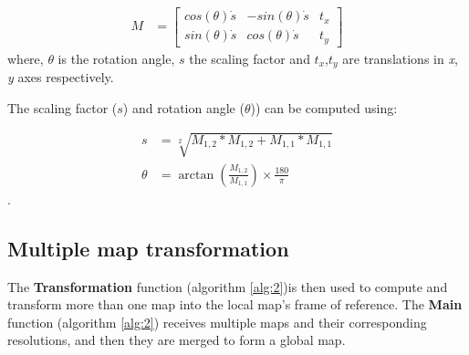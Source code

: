 \begin{align}
M &=
\begin{bmatrix}
cos(\theta)\dot s &  -sin(\theta)\dot s & t_x\\
sin(\theta)\dot s &  cos(\theta)\dot s & t_y 
\end{bmatrix}
\label{eq:rotation-mat}
\end{align}
where, \(\theta\) is the rotation angle, \(s\) the scaling factor and $t_x$,$t_y$ are translations in \textit{x}, \textit{y} axes respectively.

The scaling factor ($s$) and rotation angle ($\theta$)) can be computed using:

\begin{equation}
\begin{split} 
s &=  \sqrt[2]{ M_{1,2}*M_{1,2} + M_{1,1}*M_{1,1} }  \\ 
\theta &= \arctan{(\frac{M_{1,2}}{M_{1,1}})} \times \frac{180}{\pi}
\label{eq:rotat_scale}
\end{split}
\end{equation}.


\subsection{Multiple map transformation}

The \textbf{Transformation} function (algorithm \ref{alg:2})is then used to compute and transform more than one map into the local map's frame of reference. The \textbf{Main} function (algorithm \ref{alg:2}) receives multiple maps and their corresponding resolutions, and then they are merged to form a global map.

